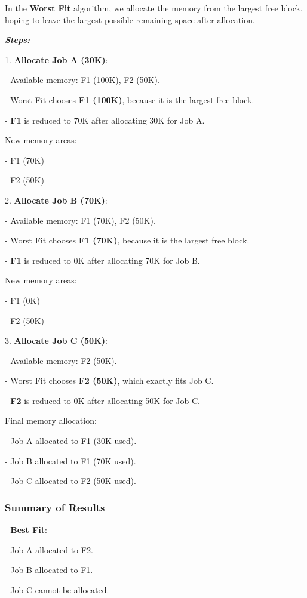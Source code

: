 \documentclass[a4paper]{book}
\begin{document}
In the \textbf{Worst Fit} algorithm, we allocate the memory from the largest free block, hoping to leave the largest possible remaining space after allocation.

\textit{\textbf{Steps:}}

1. \textbf{Allocate Job A (30K)}:

   - Available memory: F1 (100K), F2 (50K).
   
   - Worst Fit chooses \textbf{F1 (100K)}, because it is the largest free block.
   
   - \textbf{F1} is reduced to 70K after allocating 30K for Job A.

   New memory areas:
   
   - F1 (70K)
   
   - F2 (50K)

2. \textbf{Allocate Job B (70K)}:

   - Available memory: F1 (70K), F2 (50K).
   
   - Worst Fit chooses \textbf{F1 (70K)}, because it is the largest free block.
   
   - \textbf{F1} is reduced to 0K after allocating 70K for Job B.

   New memory areas:
   
   - F1 (0K)
   
   - F2 (50K)

3. \textbf{Allocate Job C (50K)}:

   - Available memory: F2 (50K).
   
   - Worst Fit chooses \textbf{F2 (50K)}, which exactly fits Job C.
   
   - \textbf{F2} is reduced to 0K after allocating 50K for Job C.

   Final memory allocation:
   
   - Job A allocated to F1 (30K used).
   
   - Job B allocated to F1 (70K used).
   
   - Job C allocated to F2 (50K used).

\subsubsection{Summary of Results}

- \textbf{Best Fit}:

  - Job A allocated to F2.
  
  - Job B allocated to F1.
  
  - Job C cannot be allocated.
\end{document}
